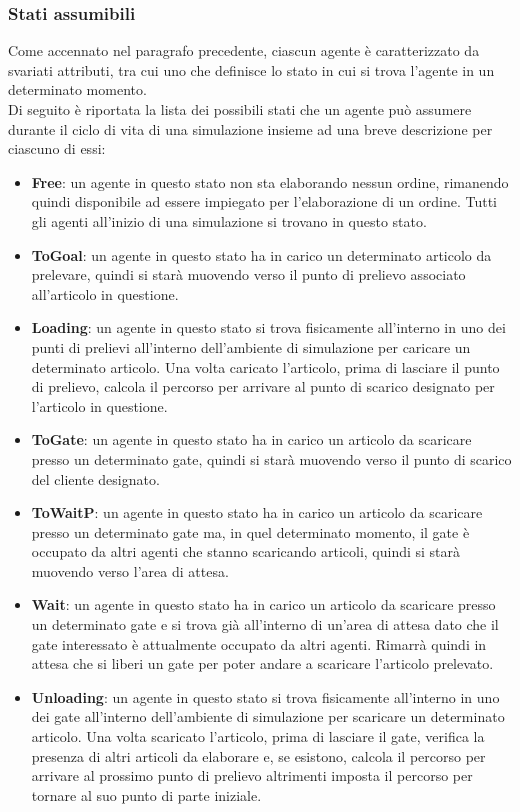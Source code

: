 \documentclass[12pt]{article}
\begin{document}
\subsubsection{Stati assumibili}\label{StatiAssumibili}
Come accennato nel paragrafo precedente, ciascun agente è caratterizzato da svariati attributi, tra cui uno che definisce lo stato in cui si trova l'agente in un determinato momento.\\
\noindent Di seguito è riportata la lista dei possibili stati che un agente può assumere durante il ciclo di vita di una simulazione insieme ad una breve descrizione per ciascuno di essi:
\begin{itemize}
    \item \textbf{Free}: un agente in questo stato non sta elaborando nessun ordine, rimanendo quindi disponibile ad essere impiegato per l'elaborazione di un ordine. Tutti gli agenti all'inizio di una simulazione si trovano in questo stato.
    \item \textbf{ToGoal}: un agente in questo stato ha in carico un determinato articolo da prelevare, quindi si starà muovendo verso il punto di prelievo associato all'articolo in questione. 
    \item \textbf{Loading}:  un agente in questo stato si trova fisicamente all'interno in uno dei punti di prelievi all'interno dell'ambiente di simulazione per caricare un determinato articolo. Una volta caricato l'articolo, prima di lasciare il punto di prelievo, calcola il percorso per arrivare al punto di scarico designato per l'articolo in questione.
    \item \textbf{ToGate}: un agente in questo stato ha in carico un articolo da scaricare presso un determinato gate, quindi si starà muovendo verso il punto di scarico del cliente designato.
    \item \textbf{ToWaitP}: un agente in questo stato ha in carico un articolo da scaricare presso un determinato gate ma, in quel determinato momento, il gate è occupato da altri agenti che stanno scaricando articoli, quindi si starà muovendo verso l'area di attesa.
    \item \textbf{Wait}:  un agente in questo stato ha in carico un articolo da scaricare presso un determinato gate e si trova già all'interno di un'area di attesa dato che il gate interessato è attualmente occupato da altri agenti. Rimarrà quindi in attesa che si liberi un gate per poter andare a scaricare l'articolo prelevato.   
    \item \textbf{Unloading}:  un agente in questo stato si trova fisicamente all'interno in uno dei gate all'interno dell'ambiente di simulazione per scaricare un determinato articolo. Una volta scaricato l'articolo, prima di lasciare il gate, verifica la presenza di altri articoli da elaborare e, se esistono, calcola il percorso per arrivare al prossimo punto di prelievo altrimenti imposta il percorso per tornare al suo punto di parte iniziale.

\end{itemize}
\end{document}
